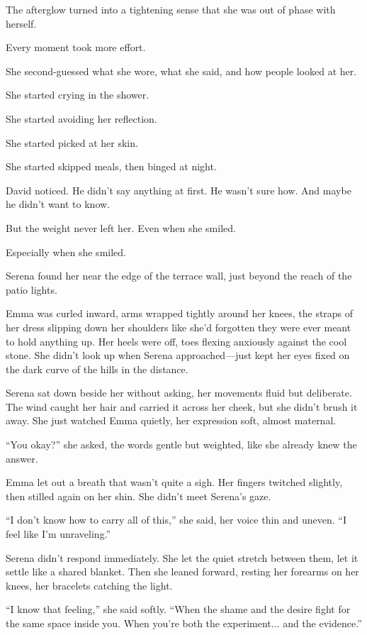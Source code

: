 The afterglow turned into a tightening sense that she was 
out of phase with herself. 

Every moment took more effort. 

She second-guessed what she wore, what she said, and how people looked at her. 

She started crying in the shower. 

She started avoiding her reflection. 

She started picked at her skin. 

She started skipped meals, then binged at night. 

David noticed. He didn’t say anything at first. He wasn’t sure how. And maybe he didn’t want to know. 

But the weight never left her. Even when she smiled.

Especially when she smiled.

Serena found her near the edge of the terrace wall, just beyond the reach of the patio lights. 

Emma was curled inward, arms wrapped tightly around her knees, the straps of her dress slipping down her shoulders 
like she’d forgotten they were ever meant to hold anything up. Her heels were off, toes flexing anxiously 
against the cool stone. She didn’t look up when Serena approached—just kept her eyes fixed on the dark 
curve of the hills in the distance.

Serena sat down beside her without asking, her movements fluid but deliberate. The wind caught her hair 
and carried it across her cheek, but she didn’t brush it away. She just watched Emma quietly, her expression 
soft, almost maternal.

``You okay?'' she asked, the words gentle but weighted, like she already knew the answer.

Emma let out a breath that wasn’t quite a sigh. Her fingers twitched slightly, then stilled again on her 
shin. She didn’t meet Serena’s gaze.

``I don’t know how to carry all of this,'' she said, her voice thin and uneven. ``I feel like I’m unraveling.''

Serena didn’t respond immediately. She let the quiet stretch between them, let it settle like a shared 
blanket. Then she leaned forward, resting her forearms on her knees, her bracelets catching the light.

``I know that feeling,'' she said softly. ``When the shame and the desire fight for the same space inside 
you. When you’re both the experiment... and the evidence.''

